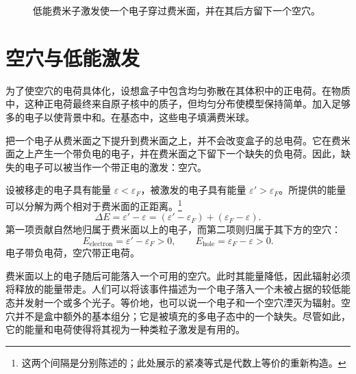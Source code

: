 \begin{figure}
\centering
{}
\caption{低能费米子激发使一个电子穿过费米面，并在其后方留下一个空穴。}
\end{figure}

\section{空穴与低能激发}

为了使空穴的电荷具体化，设想盒子中包含均匀弥散在其体积中的正电荷。在物质中，这种正电荷最终来自原子核中的质子，但均匀分布使模型保持简单。加入足够多的电子以使背景中和。在基态中，这些电子填满费米球。

把一个电子从费米面之下提升到费米面之上，并不会改变盒子的总电荷。它在费米面之上产生一个带负电的电子，并在费米面之下留下一个缺失的负电荷。因此，缺失的电子可以被当作一个带正电的激发：空穴。

\begin{classroomqa}
\end{classroomqa}

设被移走的电子具有能量 \(\varepsilon<\varepsilon_F\)，被激发的电子具有能量 \(\varepsilon'>\varepsilon_F\)。所提供的能量可以分解为两个相对于费米面的正距离。\footnote{这两个间隔是分别陈述的；此处展示的紧凑等式是代数上等价的重新构造。}
\begin{equation}
\Delta E
=\varepsilon'-\varepsilon
=(\varepsilon'-\varepsilon_F)+(\varepsilon_F-\varepsilon).
\end{equation}
第一项贡献自然地归属于费米面以上的电子，而第二项则归属于其下方的空穴：
\begin{equation}
E_{\mathrm{electron}}=\varepsilon'-\varepsilon_F>0,
\qquad
E_{\mathrm{hole}}=\varepsilon_F-\varepsilon>0.
\end{equation}
电子带负电荷，空穴带正电荷。

费米面以上的电子随后可能落入一个可用的空穴。此时其能量降低，因此辐射必须将释放的能量带走。人们可以将该事件描述为一个电子落入一个未被占据的较低能态并发射一个或多个光子。等价地，也可以说一个电子和一个空穴湮灭为辐射。空穴并不是盒中额外的基本组分；它是被填充的多电子态中的一个缺失。尽管如此，它的能量和电荷使得将其视为一种类粒子激发是有用的。

